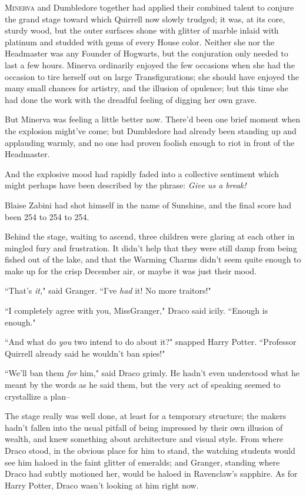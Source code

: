 
\lettrine{M}{inerva} and Dumbledore together had applied their combined talent to conjure the grand stage toward which Quirrell now slowly trudged; it was, at its core, sturdy wood, but the outer surfaces shone with glitter of marble inlaid with platinum and studded with gems of every House color. Neither she nor the Headmaster was any Founder of Hogwarts, but the conjuration only needed to last a few hours. Minerva ordinarily enjoyed the few occasions when she had the occasion to tire herself out on large Transfigurations; she should have enjoyed the many small chances for artistry, and the illusion of opulence; but this time she had done the work with the dreadful feeling of digging her own grave.

But Minerva was feeling a little better now. There'd been one brief moment when the explosion might've come; but Dumbledore had already been standing up and applauding warmly, and no one had proven foolish enough to riot in front of the Headmaster.

And the explosive mood had rapidly faded into a collective sentiment which might perhaps have been described by the phrase: \emph{Give us a break!}

Blaise Zabini had shot himself in the name of Sunshine, and the final score had been 254 to 254 to 254.

\later

Behind the stage, waiting to ascend, three children were glaring at each other in mingled fury and frustration. It didn't help that they were still damp from being fished out of the lake, and that the Warming Charms didn't seem quite enough to make up for the crisp December air, or maybe it was just their mood.

``That's \emph{it,}" said Granger. ``I've \emph{had} it! No more traitors!"

``I completely agree with you, Miss\?Granger," Draco said icily. ``Enough is enough."

``And what do \emph{you} two intend to do about it?" snapped Harry Potter. ``Professor Quirrell already said he wouldn't ban spies!"

``We'll ban them \emph{for} him," said Draco grimly. He hadn't even understood what he meant by the words as he said them, but the very act of speaking seemed to crystallize a plan\---

\later

The stage really was well done, at least for a temporary structure; the makers hadn't fallen into the usual pitfall of being impressed by their own illusion of wealth, and knew something about architecture and visual style. From where Draco stood, in the obvious place for him to stand, the watching students would see him haloed in the faint glitter of emeralds; and Granger, standing where Draco had subtly motioned her, would be haloed in Ravenclaw's sapphire. As for Harry Potter, Draco wasn't looking at him right now.

